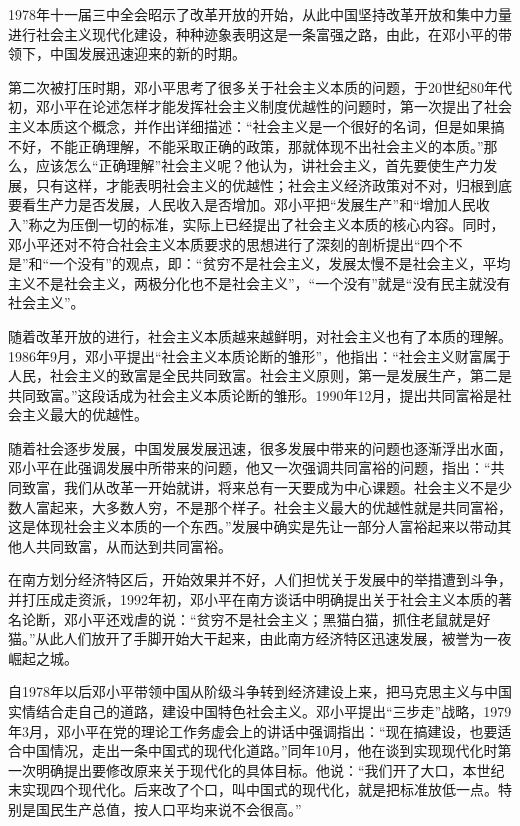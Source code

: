 \documentclass[cs4size,a4paper,nofonts]{ctexart}
\begin{document}
1978年十一届三中全会昭示了改革开放的开始，从此中国坚持改革开放和集中力量进行社会主义现代化建设，种种迹象表明这是一条富强之路，由此，在邓小平的带领下，中国发展迅速迎来的新的时期。	

第二次被打压时期，邓小平思考了很多关于社会主义本质的问题，于20世纪80年代初，邓小平在论述怎样才能发挥社会主义制度优越性的问题时，第一次提出了社会主义本质这个概念，并作出详细描述：“社会主义是一个很好的名词，但是如果搞不好，不能正确理解，不能采取正确的政策，那就体现不出社会主义的本质。”那么，应该怎么“正确理解”社会主义呢？他认为，讲社会主义，首先要使生产力发展，只有这样，才能表明社会主义的优越性；社会主义经济政策对不对，归根到底要看生产力是否发展，人民收入是否增加。邓小平把“发展生产”和“增加人民收入”称之为压倒一切的标准，实际上已经提出了社会主义本质的核心内容。同时，邓小平还对不符合社会主义本质要求的思想进行了深刻的剖析提出“四个不是”和“一个没有”的观点，即：“贫穷不是社会主义，发展太慢不是社会主义，平均主义不是社会主义，两极分化也不是社会主义”，“一个没有”就是“没有民主就没有社会主义”。

随着改革开放的进行，社会主义本质越来越鲜明，对社会主义也有了本质的理解。1986年9月，邓小平提出“社会主义本质论断的雏形”，他指出：“社会主义财富属于人民，社会主义的致富是全民共同致富。社会主义原则，第一是发展生产，第二是共同致富。”这段话成为社会主义本质论断的雏形。1990年12月，提出共同富裕是社会主义最大的优越性。

随着社会逐步发展，中国发展发展迅速，很多发展中带来的问题也逐渐浮出水面，邓小平在此强调发展中所带来的问题，他又一次强调共同富裕的问题，指出：“共同致富，我们从改革一开始就讲，将来总有一天要成为中心课题。社会主义不是少数人富起来，大多数人穷，不是那个样子。社会主义最大的优越性就是共同富裕，这是体现社会主义本质的一个东西。”发展中确实是先让一部分人富裕起来以带动其他人共同致富，从而达到共同富裕。

在南方划分经济特区后，开始效果并不好，人们担忧关于发展中的举措遭到斗争，并打压成走资派，1992年初，邓小平在南方谈话中明确提出关于社会主义本质的著名论断，邓小平还戏虐的说：“贫穷不是社会主义；黑猫白猫，抓住老鼠就是好猫。”从此人们放开了手脚开始大干起来，由此南方经济特区迅速发展，被誉为一夜崛起之城。

自1978年以后邓小平带领中国从阶级斗争转到经济建设上来，把马克思主义与中国实情结合走自己的道路，建设中国特色社会主义。邓小平提出“三步走”战略，1979年3月，邓小平在党的理论工作务虚会上的讲话中强调指出：“现在搞建设，也要适合中国情况，走出一条中国式的现代化道路。”同年10月，他在谈到实现现代化时第一次明确提出要修改原来关于现代化的具体目标。他说：“我们开了大口，本世纪末实现四个现代化。后来改了个口，叫中国式的现代化，就是把标准放低一点。特别是国民生产总值，按人口平均来说不会很高。”
\end{document}
